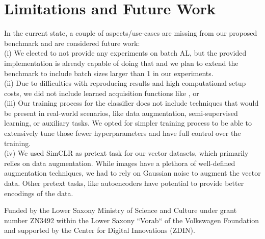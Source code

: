 \documentclass[]{article}
\begin{document}
\section{Limitations and Future Work}
In the current state, a couple of aspects/use-cases are missing from our proposed benchmark and are considered future work: \\
(i) We elected to not provide any experiments on batch AL, but the provided implementation is already capable of doing that and we plan to extend the benchmark to include batch sizes larger than 1 in our experiments. \\
(ii) Due to difficulties with reproducing results and high computational setup costs, we did not include learned acquisition functions like \cite{shao2019learning}, \cite{vu2019learning} or \cite{konyushkova2017learning} \\
(iii) Our training process for the classifier does not include techniques that would be present in real-world scenarios, like data augmentation, semi-supervised learning, or auxiliary tasks. We opted for simpler training process to be able to extensively tune those fewer hyperparameters and have full control over the training.\\
(iv) We used SimCLR as pretext task for our vector datasets, which primarily relies on data augmentation. While images have a plethora of well-defined augmentation techniques, we had to rely on Gaussian noise to augment the vector data. Other pretext tasks, like autoencoders have potential to provide better encodings of the data.

\newpage

\begin{ack}
	Funded by the Lower Saxony Ministry of Science and Culture under grant number ZN3492 within the Lower Saxony “Vorab“ of the Volkswagen Foundation and supported by the Center for Digital Innovations (ZDIN).
\end{ack}


 

\appendix
\end{document}
